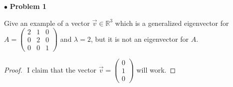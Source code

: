 \documentclass{article}
\begin{document}
$ \bullet$ \textbf{Problem 1}
\medskip

\begin{itshape}
Give an example of a vector $\vec{v} \in \mathbb{R}^3$ which is a generalized eigenvector for $A= \begin{pmatrix} 2& 1 & 0 \\ 0&2&0 \\ 0&0&1 \end{pmatrix}$ and $\lambda = 2$, but it is not an eigenvector for $A$.
\end{itshape}
\medskip

\begin{proof}
$ $\newline
I claim that the vector $\vec{v} = \begin{pmatrix} 0 \\1\\0 \end{pmatrix}$ will work.


\end{proof}
\end{document}

